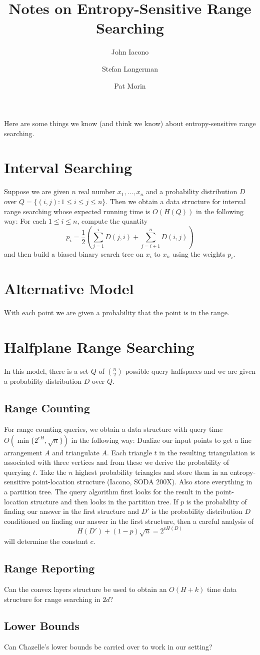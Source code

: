\documentclass{article}
\title{Notes on Entropy-Sensitive Range Searching}
\author{John Iacono \and Stefan Langerman \and Pat Morin}
\begin{document}
\maketitle

Here are some things we know (and think we know) about
entropy-sensitive range searching.

\section{Interval Searching}

Suppose we are given $n$ real number $x_1,\ldots,x_n$ and a
probability distribution $D$ over $Q=\{(i,j): 1\le i\le j\le n\}$.
Then we obtain a data structure for interval range searching whose
expected running time is $O(H(Q))$ in the following way:  For each
$1\le i\le n$, compute the quantity
\[
	p_i = \frac{1}{2}\left(\sum_{j=1}^i D(j,i) + \sum_{j=i+1}^n D(i,j)\right)
\]
and then build a biased binary search tree on $x_i$ to $x_n$ using the
weights $p_i$.


\section{Alternative Model}

With each point we are given a probability that the point is in the
range.

\section{Halfplane Range Searching}

In this model, there is a set $Q$ of ${n \choose 2}$ possible query
halfspaces and we are given a probability distribution $D$ over $Q$.

\subsection{Range Counting}

For range counting queries, we obtain a data structure with query time
$O(\min\{2^{cH},\sqrt{n}\})$ in the following way:  Dualize our input
points to get a line arrangement $A$ and triangulate $A$.  Each
triangle $t$ in the resulting triangulation is associated with three
vertices and from these we derive the probability of querying $t$.
Take the $n$ highest probability triangles and store them in an
entropy-sensitive point-location structure (Iacono, SODA 200X).  Also
store everything in a partition tree.  The query algorithm first looks
for the result in the point-location structure and then looks in the
partition tree. If $p$ is the probability of finding our answer in the
first structure and $D'$ is the probability distribution $D$
conditioned on finding our answer in the first structure, then a careful analysis of
\[
     H(D') + (1-p)\sqrt{n} = 2^{cH(D)}
\]
will determine the constant $c$.

\subsection{Range Reporting}

Can the convex layers structure be used to obtain an $O(H+k)$ time
data structure for range searching in $2d$?

\subsection{Lower Bounds}

Can Chazelle's lower bounds be carried over to work in our setting?
\end{document}
